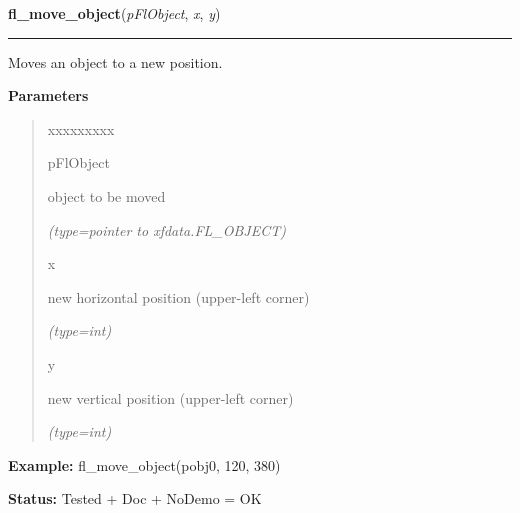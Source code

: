     \label{xformslib:flbasic:fl_move_object}

    \vspace{0.5ex}

\hspace{.8\funcindent}\begin{boxedminipage}{\funcwidth}

    \raggedright \textbf{fl\_move\_object}(\textit{pFlObject}, \textit{x}, \textit{y})

    \vspace{-1.5ex}

    \rule{\textwidth}{0.5\fboxrule}
\setlength{\parskip}{2ex}
    Moves an object to a new position.

\setlength{\parskip}{1ex}
      \textbf{Parameters}
      \vspace{-1ex}

      \begin{quote}
        \begin{Ventry}{xxxxxxxxx}

          \item[pFlObject]

          object to be moved

            {\it (type=pointer to xfdata.FL\_OBJECT)}

          \item[x]

          new horizontal position (upper-left corner)

            {\it (type=int)}

          \item[y]

          new vertical position (upper-left corner)

            {\it (type=int)}

        \end{Ventry}

      \end{quote}

\textbf{Example:} fl\_move\_object(pobj0, 120, 380)



\textbf{Status:} Tested + Doc + NoDemo = OK



    \end{boxedminipage}

    \label{xformslib:flbasic:fl_fit_object_label}

